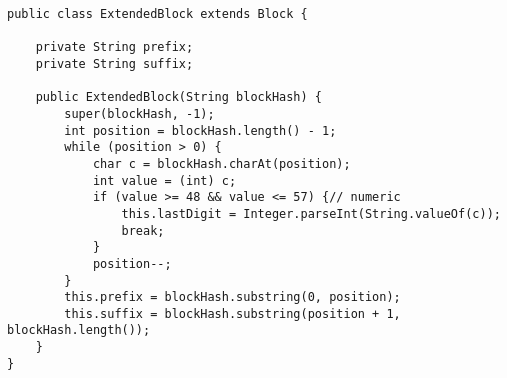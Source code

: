 \begin{lstlisting}[basicstyle=\small]
public class ExtendedBlock extends Block {

    private String prefix;
    private String suffix;

    public ExtendedBlock(String blockHash) {
        super(blockHash, -1);
        int position = blockHash.length() - 1;
        while (position > 0) {
            char c = blockHash.charAt(position);
            int value = (int) c;
            if (value >= 48 && value <= 57) {// numeric
                this.lastDigit = Integer.parseInt(String.valueOf(c));
                break;
            }
            position--;
        }
        this.prefix = blockHash.substring(0, position);
        this.suffix = blockHash.substring(position + 1, blockHash.length());
    }
}
\end{lstlisting}

